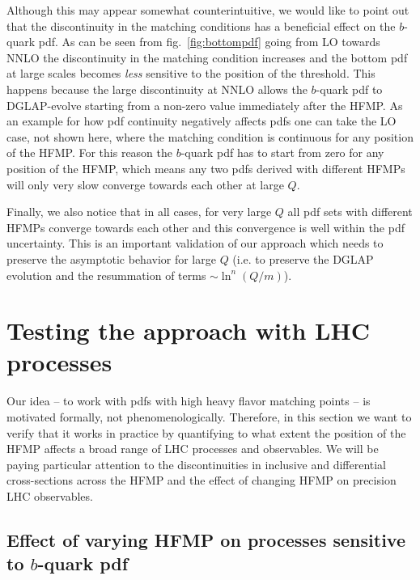 \documentclass[letter,11pt]{article}
\begin{document}
Although this may appear somewhat counterintuitive, we would like to point out that the discontinuity in the matching conditions has a beneficial effect on the $b$-quark pdf. As can be seen from fig.~\ref{fig:bottompdf} going from LO towards NNLO the discontinuity in the matching condition increases and the bottom pdf at large scales becomes {\it less} sensitive to the position of the threshold. This happens because the large discontinuity at NNLO allows the $b$-quark pdf to DGLAP-evolve starting from a non-zero value immediately after the HFMP. As an example for how pdf continuity negatively affects pdfs one can take the LO case, not shown here, where the matching condition is continuous for any position of the HFMP. For this reason the $b$-quark pdf has to start from zero for any position of the HFMP, which means any two pdfs derived with different HFMPs will only very slow converge towards each other at large $Q$.

Finally, we also notice that in all cases, for very large $Q$ all pdf sets with different HFMPs converge towards each other and this convergence is well within the pdf uncertainty. This is an important validation of our approach which needs to preserve the asymptotic behavior for large $Q$ (i.e. to preserve the DGLAP evolution and the resummation of terms $\sim\ln^n(Q/m)$).




\section{Testing the approach with LHC processes}


Our idea -- to work with pdfs with high heavy flavor matching points -- is motivated formally, not phenomenologically. Therefore, in this section we want to verify that it works in practice by quantifying to what extent the position of the HFMP affects a broad range of LHC processes and observables. We will be paying particular attention to the discontinuities in inclusive and differential cross-sections across the HFMP and the effect of changing HFMP on precision LHC observables.




\subsection{Effect of varying HFMP on processes sensitive to $b$-quark pdf}\label{sec:threshold-switch}
\end{document}
